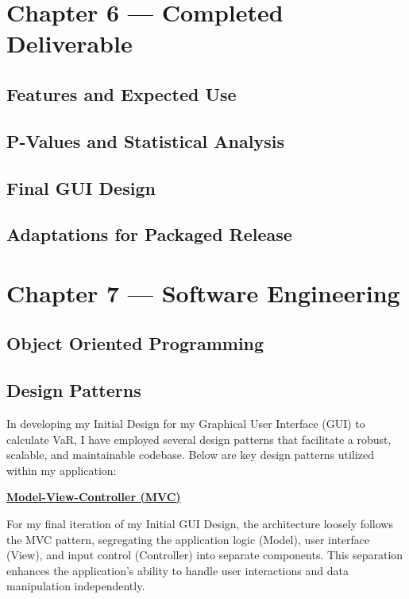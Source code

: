 \documentclass{article}
\begin{document}
\section{Chapter 6 --- Completed Deliverable}

\subsection{Features and Expected Use}

\subsection{P-Values and Statistical Analysis}

\subsection{Final GUI Design}

\subsection{Adaptations for Packaged Release}






\section{Chapter 7 --- Software Engineering}

\subsection{Object Oriented Programming}

\subsection{Design Patterns}

In developing my Initial Design for my Graphical User Interface (GUI) to calculate VaR, I have employed several design patterns that facilitate a robust, scalable, and maintainable codebase. Below are key design patterns utilized within my application:\\\vspace{0.3cm}

\underline{\textbf{Model-View-Controller (MVC)}}\\\vspace{0.3cm}

For my final iteration of my Initial GUI Design, the architecture loosely follows the MVC pattern, segregating the application logic (Model), user interface (View), and input control (Controller) into separate components. This separation enhances the application's ability to handle user interactions and data manipulation independently.
\end{document}
